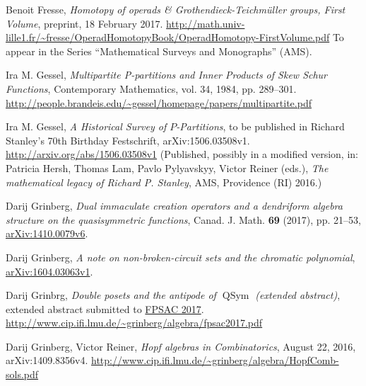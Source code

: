 \documentclass[numbers=enddot,12pt,final,onecolumn,notitlepage,abstracton]{scrartcl}%
\theoremstyle{definition}
\newcommand{\QSym}{{\operatorname{QSym}}}
\begin{document}
\begin{thebibliography}{99999999}
Benoit Fresse, \textit{Homotopy of operads \&
Grothendieck-Teichm\"{u}ller groups, First Volume},
preprint, 18 February 2017.\newline
\url{http://math.univ-lille1.fr/~fresse/OperadHomotopyBook/OperadHomotopy-FirstVolume.pdf}
\newline
To appear in the Series ``Mathematical Surveys and Monographs'' (AMS).

Ira M. Gessel, \textit{Multipartite
P-partitions and Inner Products of Skew Schur Functions}, Contemporary
Mathematics, vol. 34, 1984, pp. 289--301.\newline%
\url{http://people.brandeis.edu/~gessel/homepage/papers/multipartite.pdf}

Ira M. Gessel, \textit{A Historical Survey of
$P$-Partitions}, to be published in Richard Stanley's 70th Birthday Festschrift,
arXiv:1506.03508v1.\newline
\url{http://arxiv.org/abs/1506.03508v1}
\newline (Published, possibly in a modified version, in:
Patricia Hersh, Thomas Lam, Pavlo Pylyavskyy, Victor Reiner (eds.),
\textit{The mathematical legacy of Richard P. Stanley},
AMS, Providence (RI) 2016.)


Darij Grinberg,
\textit{Dual immaculate creation operators and a dendriform algebra
structure on the quasisymmetric functions},
Canad. J. Math. \textbf{69} (2017), pp. 21--53,
\href{http://arxiv.org/abs/1410.0079v6}{arXiv:1410.0079v6}.

Darij Grinberg,
\textit{A note on non-broken-circuit sets and the chromatic polynomial},
\href{https://arxiv.org/abs/1604.03063v1}{arXiv:1604.03063v1}.

Darij Grinbrg, \textit{Double posets and the antipode of $\QSym$
(extended abstract)},
extended abstract submitted to \href{https://sites.google.com/site/fpsac2017/}{FPSAC 2017}.
\url{http://www.cip.ifi.lmu.de/~grinberg/algebra/fpsac2017.pdf}

Darij Grinberg, Victor Reiner, \textit{Hopf algebras
in Combinatorics}, August 22, 2016, arXiv:1409.8356v4.\newline
\url{http://www.cip.ifi.lmu.de/~grinberg/algebra/HopfComb-sols.pdf}


\end{thebibliography}
\end{document}
